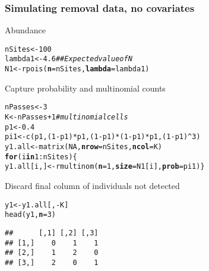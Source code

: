 \documentclass[color=usenames,dvipsnames]{beamer}\usepackage[]{graphicx}\usepackage[]{xcolor}
\makeatletter
\newcommand{\hlnum}[1]{\textcolor[rgb]{0.69,0.494,0}{#1}}%
\newcommand{\hlcom}[1]{\textcolor[rgb]{0.514,0.506,0.514}{\textit{#1}}}%
\newcommand{\hlopt}[1]{\textcolor[rgb]{0,0,0}{#1}}%
\newcommand{\hlstd}[1]{\textcolor[rgb]{0,0,0}{#1}}%
\newcommand{\hlkwa}[1]{\textcolor[rgb]{0,0,0}{\textbf{#1}}}%
\newcommand{\hlkwb}[1]{\textcolor[rgb]{0,0.341,0.682}{#1}}%
\newcommand{\hlkwc}[1]{\textcolor[rgb]{0,0,0}{\textbf{#1}}}%
\newcommand{\hlkwd}[1]{\textcolor[rgb]{0.004,0.004,0.506}{#1}}%
\newenvironment{kframe}{%
 \def\at@end@of@kframe{}%
 \ifinner\ifhmode%
  \def\at@end@of@kframe{\end{minipage}}%
  \begin{minipage}{\columnwidth}%
 \fi\fi%
 \def\FrameCommand##1{\hskip\@totalleftmargin \hskip-\fboxsep
 \colorbox{shadecolor}{##1}\hskip-\fboxsep
     \hskip-\linewidth \hskip-\@totalleftmargin \hskip\columnwidth}%
 \MakeFramed {\advance\hsize-\width
   \@totalleftmargin\z@ \linewidth\hsize
   \@setminipage}}%
 {\par\unskip\endMakeFramed%
 \at@end@of@kframe}
\newenvironment{knitrout}{}{} %
\makeatother
\begin{document}
\begin{frame}[fragile]
  \frametitle{Simulating removal data, no covariates}
  \small
  Abundance
\begin{knitrout}\scriptsize
{}\color{fgcolor}\begin{kframe}
\begin{alltt}
\hlstd{nSites} \hlkwb{<-} \hlnum{100}
\hlstd{lambda1} \hlkwb{<-} \hlnum{4.6}  \hlcom{## Expected value of N}
\hlstd{N1} \hlkwb{<-} \hlkwd{rpois}\hlstd{(}\hlkwc{n}\hlstd{=nSites,} \hlkwc{lambda}\hlstd{=lambda1)}
\end{alltt}
\end{kframe}
\end{knitrout}
  \pause
  \vfill
  Capture probability and multinomial counts%
\begin{knitrout}\scriptsize
{}\color{fgcolor}\begin{kframe}
\begin{alltt}
\hlstd{nPasses} \hlkwb{<-} \hlnum{3}
\hlstd{K} \hlkwb{<-} \hlstd{nPasses}\hlopt{+}\hlnum{1}  \hlcom{# multinomial cells}
\hlstd{p1} \hlkwb{<-} \hlnum{0.4}
\hlstd{pi1} \hlkwb{<-} \hlkwd{c}\hlstd{(p1, (}\hlnum{1}\hlopt{-}\hlstd{p1)}\hlopt{*}\hlstd{p1, (}\hlnum{1}\hlopt{-}\hlstd{p1)}\hlopt{*}\hlstd{(}\hlnum{1}\hlopt{-}\hlstd{p1)}\hlopt{*}\hlstd{p1, (}\hlnum{1}\hlopt{-}\hlstd{p1)}\hlopt{^}\hlnum{3}\hlstd{)}
\hlstd{y1.all} \hlkwb{<-} \hlkwd{matrix}\hlstd{(}\hlnum{NA}\hlstd{,} \hlkwc{nrow}\hlstd{=nSites,} \hlkwc{ncol}\hlstd{=K)}
\hlkwa{for}\hlstd{(i} \hlkwa{in} \hlnum{1}\hlopt{:}\hlstd{nSites) \{}
    \hlstd{y1.all[i,]} \hlkwb{<-} \hlkwd{rmultinom}\hlstd{(}\hlkwc{n}\hlstd{=}\hlnum{1}\hlstd{,} \hlkwc{size}\hlstd{=N1[i],} \hlkwc{prob}\hlstd{=pi1)    \}}
\end{alltt}
\end{kframe}
\end{knitrout}
  \pause
  \vfill
  Discard final column of individuals not detected
\begin{knitrout}\scriptsize
{}\color{fgcolor}\begin{kframe}
\begin{alltt}
\hlstd{y1} \hlkwb{<-} \hlstd{y1.all[,}\hlopt{-}\hlstd{K]}
\hlkwd{head}\hlstd{(y1,} \hlkwc{n}\hlstd{=}\hlnum{3}\hlstd{)}
\end{alltt}
\begin{verbatim}
##      [,1] [,2] [,3]
## [1,]    0    1    1
## [2,]    1    2    0
## [3,]    2    0    1
\end{verbatim}
\end{kframe}
\end{knitrout}
\end{frame}
\end{document}
